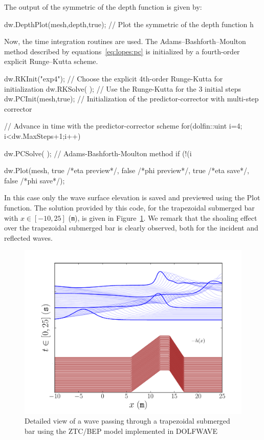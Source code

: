 The output of the symmetric of the depth function is given by:
\begin{c++}
dw.DepthPlot(mesh,depth,true); // Plot the symmetric of the depth function h
\end{c++}
Now, the time integration routines are used.
The Adams--Bashforth--Moulton method described by
equations~\eqref{eq:lopes:pc} is initialized by a fourth-order explicit
Runge--Kutta scheme.
\begin{c++}
dw.RKInit("exp4");    // Choose the explicit 4th-order Runge-Kutta for initialization
dw.RKSolve( );        // Use the Runge-Kutta for the 3 initial steps
dw.PCInit(mesh,true); // Initialization of the predictor-corrector with multi-step corrector

// Advance in time with the predictor-corrector scheme
for(dolfin::uint i=4; i<dw.MaxSteps+1;i++)
{
  dw.PCSolve( ); // Adams-Bashforth-Moulton method
  if (!(i%

  dw.Plot(mesh, true /*eta preview*/, false /*phi preview*/,
          true /*eta save*/, false /*phi save*/);
}
\end{c++}\vspace*{10pt}
In this case only the wave surface elevation is saved and previewed
using the Plot function.  The solution provided by this code, for the
trapezoidal submerged bar with $x\in[-10,25]$ ({\tt m}), is given in
Figure~\ref{fig:lopes:submergedbar}.  We remark that the shoaling
effect over the trapezoidal submerged bar is clearly observed, both
for the incident and reflected waves.

\begin{figure}
\bwfig
  \centering
  \includegraphics[width=\largefig]{chapters/lopes/pdf/submergedbar.pdf}
  \caption{Detailed view of a wave passing through a trapezoidal
    submerged bar using the ZTC/BEP model implemented in DOLFWAVE}
  \label{fig:lopes:submergedbar}
\end{figure}

